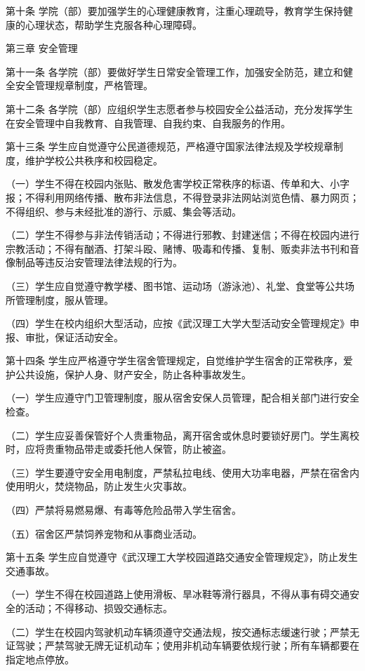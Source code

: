 \documentclass[UTF8,12pt,a4paper]{report}
\begin{document}
第十条 学院（部）要加强学生的心理健康教育，注重心理疏导，教育学生保持健康的心理状态，帮助学生克服各种心理障碍。

第三章 安全管理

第十一条 各学院（部）要做好学生日常安全管理工作，加强安全防范，建立和健全安全管理规章制度，严格管理。

第十二条 各学院（部）应组织学生志愿者参与校园安全公益活动，充分发挥学生在安全管理中自我教育、自我管理、自我约束、自我服务的作用。

第十三条 学生应自觉遵守公民道德规范，严格遵守国家法律法规及学校规章制度，维护学校公共秩序和校园稳定。

（一）学生不得在校园内张贴、散发危害学校正常秩序的标语、传单和大、小字报；不得利用网络传播、散布非法信息，不得登录非法网站浏览色情、暴力网页；不得组织、参与未经批准的游行、示威、集会等活动。

（二）学生不得参与非法传销活动；不得进行邪教、封建迷信；不得在校园内进行宗教活动；不得有酗酒、打架斗殴、赌博、吸毒和传播、复制、贩卖非法书刊和音像制品等违反治安管理法律法规的行为。

（三）学生应自觉遵守教学楼、图书馆、运动场（游泳池）、礼堂、食堂等公共场所管理制度，服从管理。

（四）学生在校内组织大型活动，应按《武汉理工大学大型活动安全管理规定》申报、审批，保证活动安全。

第十四条 学生应严格遵守学生宿舍管理规定，自觉维护学生宿舍的正常秩序，爱护公共设施，保护人身、财产安全，防止各种事故发生。

（一）学生应遵守门卫管理制度，服从宿舍安保人员管理，配合相关部门进行安全检查。

（二）学生应妥善保管好个人贵重物品，离开宿舍或休息时要锁好房门。学生离校时，应将贵重物品带走或委托他人保管，防止被盗。

（三）学生要遵守安全用电制度，严禁私拉电线、使用大功率电器，严禁在宿舍内使用明火，焚烧物品，防止发生火灾事故。

（四）严禁将易燃易爆、有毒等危险品带入学生宿舍。

（五）宿舍区严禁饲养宠物和从事商业活动。

第十五条 学生应自觉遵守《武汉理工大学校园道路交通安全管理规定》，防止发生交通事故。

（一）学生不得在校园道路上使用滑板、旱冰鞋等滑行器具，不得从事有碍交通安全的活动；不得移动、损毁交通标志。

（二）学生在校园内驾驶机动车辆须遵守交通法规，按交通标志缓速行驶；严禁无证驾驶；严禁驾驶无牌无证机动车；使用非机动车辆要依规行驶；所有车辆都要在指定地点停放。
\end{document}
